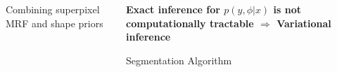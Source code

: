 \documentclass[mathserif,final,hyperref={pdfpagelabels=false}]{beamer} %
\begin{document}
\begin{frame}
\begin{columns}
\begin{column1lti}
\begin{blocklti}{Combining superpixel MRF and shape priors}
\begin{columns}[t]
\begin{column}{0.5\linewidth}

\end{column}

\end{columns}

\end{blocklti}






%

\end{column1lti}



\begin{column2lti}


\begin{colorblocklti}
\begin{center}
{\bfseries 
Exact inference for $p(y,\phi|x)$ is not computationally tractable $\Rightarrow$ Variational inference}
\end{center}

\end{colorblocklti}

\vfill

\begin{blockredlti}{Segmentation Algorithm}


\end{blockredlti}
\end{column2lti}
\end{columns}
\end{frame}
\end{document}
